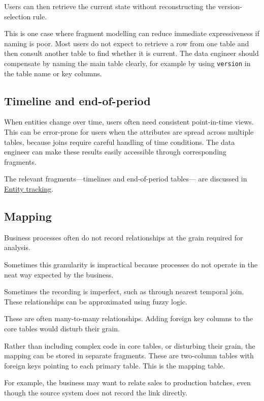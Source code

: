 \documentclass[10pt,openany,10pt]{book}
\begin{document}
Users can then retrieve the current state without reconstructing the
version-selection rule.

This is one case where fragment modelling can reduce immediate
expressiveness if naming is poor. Most users do not expect to retrieve a
row from one table and then consult another table to find whether it is
current. The data engineer should compensate by naming the main table
clearly, for example by using \texttt{version} in the table name or key
columns.

\subsection{Timeline and
end-of-period}\label{timeline-and-end-of-period}

When entities change over time, users often need consistent
point-in-time views. This can be error-prone for users when the
attributes are spread across multiple tables, because joins require
careful handling of time conditions. The data engineer can make these
results easily accessible through corresponding fragments.

The relevant fragments---timelines and end-of-period tables--- are
discussed in \hyperref[docs-creating-information-entity-tracking]{Entity
tracking}.

\subsection{Mapping}\label{mapping}

Business processes often do not record relationships at the grain
required for analysis.

Sometimes this granularity is impractical because processes do not
operate in the neat way expected by the business.

Sometimes the recording is imperfect, such as through nearest temporal
join. These relationships can be approximated using fuzzy logic.

These are often many-to-many relationships. Adding foreign key columns
to the core tables would disturb their grain.

Rather than including complex code in core tables, or disturbing their
grain, the mapping can be stored in separate fragments. These are
two-column tables with foreign keys pointing to each primary table. This
is the mapping table.

For example, the business may want to relate sales to production
batches, even though the source system does not record the link
directly.
\end{document}
